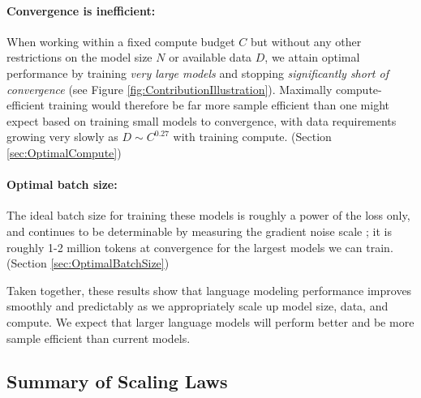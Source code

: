 \documentclass[english]{article}
\begin{document}
\paragraph{Convergence is inefficient:} When working within a fixed compute budget $C$ but without any other restrictions on the model size $N$ or available data $D$, we attain optimal performance by training \emph{very large models} and stopping \emph{significantly short of convergence} (see Figure \ref{fig:ContributionIllustration}).  Maximally compute-efficient training would therefore be far more sample efficient than one might expect based on training small models to convergence, with data requirements growing very slowly as $D \sim C^{0.27}$ with training compute. (Section \ref{sec:OptimalCompute})

\paragraph{Optimal batch size:} The ideal batch size for training these models is roughly a power of the loss only, and continues to be determinable by measuring the gradient noise scale \cite{1812.06162}; it is roughly 1-2 million tokens at convergence for the largest models we can train. (Section \ref{sec:OptimalBatchSize})


Taken together, these results show that language modeling performance improves smoothly and predictably as we appropriately scale up model size, data, and compute.  We expect that larger language models will perform better and be more sample efficient than current models.


\subsection{Summary of Scaling Laws}
\end{document}
